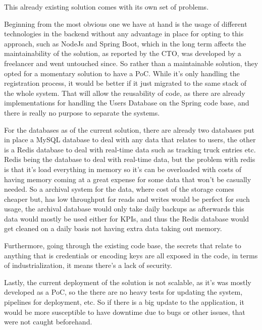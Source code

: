 This already existing solution comes with its own set of problems.

Beginning from the most obvious one we have at hand is the usage of different technologies in
the backend without any advantage in place for opting to this approach, such as NodeJs and Spring
Boot, which in the long term affects the maintainability of the solution, as reported by the CTO,
was developed by a freelancer and went untouched since. So rather than a maintainable solution,
they opted for a momentary solution to have a PoC.
While it's only handling the registration process, it would be better if it just migrated to the
same stack of the whole system. That will allow the reusability of code, as there are already
implementations for handling the Users Database on the Spring code base, and there is really
no purpose to separate the systems.

For the databases as of the current solution,
there are already two databases put in place a MySQL database to deal with any data that relates to users,
the other is a Redis database to deal with real-time data such as tracking truck entries etc.
Redis being the database to deal with real-time data, but the problem with redis is that it's load everything
in memory so it's can be overloaded with costs of having memory coming at a great expense for some data
that won't be casually needed. So a archival system for the data, where cost of the storage comes cheaper but,
has low throughput for reads and writes would be perfect for such usage, the archival database would only take
daily backups as afterwards this data would mostly be used either for KPIs, and thus the Redis database would
get cleaned on a daily basis not having extra data taking out memory.

Furthermore, going through the existing code base, the secrets that relate to anything that is credentials or
encoding keys are all exposed in the code, in terms of industrialization, it means there's a lack of security.

Lastly, the current deployment of the solution is not scalable, as it's was mostly developed as a PoC,
so the there are no heavy tests for updating the system, pipelines for deployment, etc. So if there is a
big update to the application, it would be more susceptible to have downtime due to bugs or other issues,
that were not caught beforehand.

